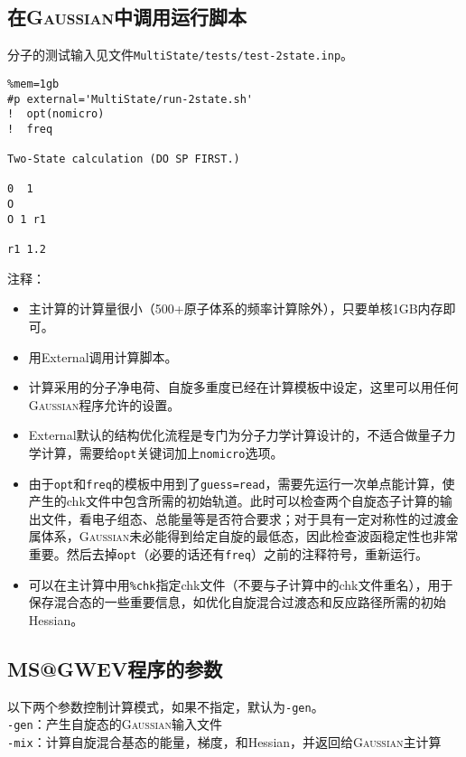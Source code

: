 \documentclass[UTF8]{ctexart}
\begin{document}
\subsection{在\textsc{Gaussian}中调用运行脚本}

分子的测试输入见文件\verb|MultiState/tests/test-2state.inp|。
\begin{lstlisting}[alsoletter={\%\#},morekeywords={\%nprocshared,\%mem,\#p,gb,external}]
%nprocshared=1
%mem=1gb
#p external='MultiState/run-2state.sh'
!  opt(nomicro)
!  freq

Two-State calculation (DO SP FIRST.)

0  1
O
O 1 r1

r1 1.2
\end{lstlisting}
注释：
\begin{itemize}
\item 主计算的计算量很小（500+原子体系的频率计算除外），只要单核1GB内存即可。
\item 用\textsf{External}调用计算脚本。
\item 计算采用的分子净电荷、自旋多重度已经在计算模板中设定，这里可以用任何\textsc{Gaussian}程序允许的设置。
\item \textsf{External}默认的结构优化流程是专门为分子力学计算设计的，不适合做量子力学计算，需要给\verb|opt|关键词加上\verb|nomicro|选项。
\item 由于\verb|opt|和\verb|freq|的模板中用到了\verb|guess=read|，需要先运行一次单点能计算，使产生的chk文件中包含所需的初始轨道。此时可以检查两个自旋态子计算的输出文件，看电子组态、总能量等是否符合要求；对于具有一定对称性的过渡金属体系，\textsc{Gaussian}未必能得到给定自旋的最低态，因此检查波函稳定性也非常重要。然后去掉\verb|opt|（必要的话还有\verb|freq|）之前的注释符号，重新运行。
\item 可以在主计算中用\verb|%chk|指定chk文件（不要与子计算中的chk文件重名），用于保存混合态的一些重要信息，如优化自旋混合过渡态和反应路径所需的初始Hessian。
\end{itemize}

\subsection{MS@GWEV程序的参数}

以下两个参数控制计算模式，如果不指定，默认为\verb|-gen|。 \\
\verb|-gen|：产生自旋态的\textsc{Gaussian}输入文件 \\
\verb|-mix|：计算自旋混合基态的能量，梯度，和Hessian，并返回给\textsc{Gaussian}主计算
\end{document}
